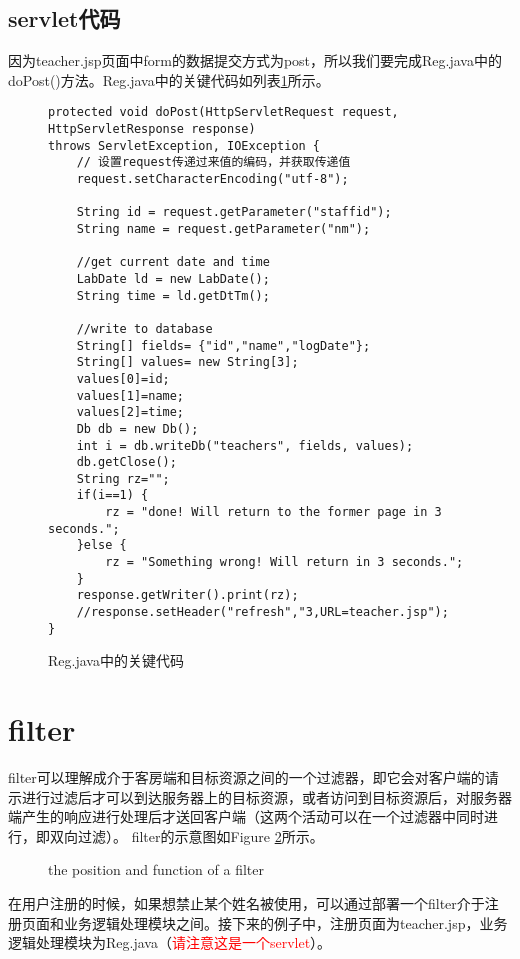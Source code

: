 \documentclass[a4paper]{book}
\begin{document}
\subsection{servlet代码}
因为teacher.jsp页面中form的数据提交方式为post，所以我们要完成Reg.java中的doPost()方法。Reg.java中的关键代码如列表\ref{reg}所示。
\begin{figure}
\begin{lstlisting}
protected void doPost(HttpServletRequest request, HttpServletResponse response) 
throws ServletException, IOException {
	// 设置request传递过来值的编码，并获取传递值
	request.setCharacterEncoding("utf-8");
	
	String id = request.getParameter("staffid");
	String name = request.getParameter("nm");
	
	//get current date and time
	LabDate ld = new LabDate();
	String time = ld.getDtTm();
	
	//write to database
	String[] fields= {"id","name","logDate"};
	String[] values= new String[3];
	values[0]=id;
	values[1]=name;
	values[2]=time;
	Db db = new Db();
	int i = db.writeDb("teachers", fields, values);
	db.getClose();
	String rz="";
	if(i==1) {
		rz = "done! Will return to the former page in 3 seconds.";
	}else {
		rz = "Something wrong! Will return in 3 seconds.";
	}
	response.getWriter().print(rz);
	//response.setHeader("refresh","3,URL=teacher.jsp");
}
\end{lstlisting}
\caption{Reg.java中的关键代码}
\label{reg}
\end{figure}

\section{filter}
filter可以理解成介于客房端和目标资源之间的一个过滤器，即它会对客户端的请示进行过滤后才可以到达服务器上的目标资源，或者访问到目标资源后，对服务器端产生的响应进行处理后才送回客户端（这两个活动可以在一个过滤器中同时进行，即双向过滤）。
filter的示意图如Figure \ref{filter}所示。
\begin{figure}
\caption{the position and function of a filter}
\label{filter}
\end{figure}
在用户注册的时候，如果想禁止某个姓名被使用，可以通过部署一个filter介于注册页面和业务逻辑处理模块之间。接下来的例子中，注册页面为teacher.jsp，业务逻辑处理模块为Reg.java（\textcolor{red}{请注意这是一个servlet}）。
\end{document}

